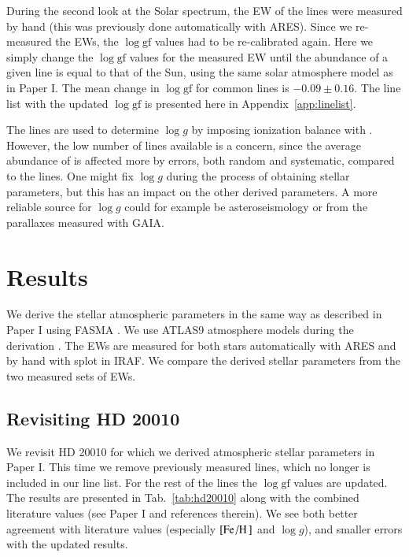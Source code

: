 \documentclass{aa}
\begin{document}
During the second look at the Solar spectrum, the EW of the lines were measured
by hand (this was previously done automatically with ARES). Since we re-measured
the EWs, the $\log \mathrm{gf}$ values had to be re-calibrated again. Here we
simply change the $\log \mathrm{gf}$ values for the measured EW until the
abundance of a given line is equal to that of the Sun, using the same solar
atmosphere model as in Paper I. The mean change in $\log \mathrm{gf}$ for common
lines is $-0.09 \pm 0.16$. The line list with the updated $\log \mathrm{gf}$ is
presented here in Appendix~\ref{app:linelist}.

The  lines are used to determine $\log g$ by imposing ionization
balance with . However, the low number of  lines
available is a concern, since the average abundance of  is affected
more by errors, both random and systematic, compared to the  lines.
One might fix $\log g$ during the process of obtaining stellar parameters, but
this has an impact on the other derived parameters. A more reliable source for
$\log g$ could for example be asteroseismology or from the parallaxes measured
with GAIA.



\section{Results}
\label{sec:results}

We derive the stellar atmospheric parameters in the same way as described in
Paper I using FASMA \citep{Andreasen2017a}. We use ATLAS9 atmosphere models
during the derivation \citep{Kurucz1993}. The EWs are measured for both stars
automatically with ARES \citep{Sousa2015a} and by hand with splot in IRAF. We
compare the derived stellar parameters from the two measured sets of EWs.


\subsection{Revisiting HD 20010}
\label{sec:hd20010}

We revisit HD 20010 for which we derived atmospheric stellar parameters in Paper I.
This time we remove previously measured lines, which no longer is included in our
line list. For the rest of the lines the $\log \mathrm{gf}$ values are updated.
The results are presented in Tab.~\ref{tab:hd20010} along with the combined
literature values (see Paper I and references therein). We see both better
agreement with literature values (especially $[\ion{Fe}/\ion{H}]$ and $\log g$),
and smaller errors with the updated results.
\end{document}

